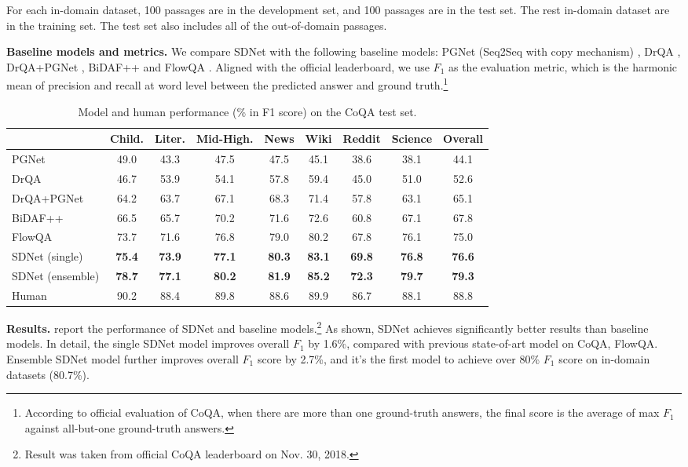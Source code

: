 \documentclass{article} \usepackage{sdnet,times}
\begin{document}
For each in-domain dataset, 100 passages are in the development set, and 100 passages are in the test set. The rest in-domain dataset are in the training set. The test set also includes all of the out-of-domain passages.

\textbf{Baseline models and metrics.}
We compare SDNet with the following baseline models: PGNet (Seq2Seq with copy mechanism) \citep{pgnet}, DrQA \citep{drqa}, DrQA+PGNet \citep{coqa}, BiDAF++ \citep{bidafplusplus} and FlowQA \citep{flowqa}. Aligned with the official leaderboard, we use $F_1$ as the evaluation metric, which is the harmonic mean of precision and recall at word level between the predicted answer and ground truth.\footnote{According to official evaluation of CoQA, when there are more than one ground-truth answers, the final score is the average of max $F_1$ against all-but-one ground-truth answers.}

\begin{table*}[t]
\centering
\caption{Model and human performance (\% in F1 score) on the CoQA test set.} 
\label{table:mainresult}
\vspace{-0.5\baselineskip}
\setlength{\tabcolsep}{2pt}
\begin{tabular}{l|ccccccc|c}
\toprule
 & Child. & Liter. & Mid-High. & News & Wiki & Reddit & Science & Overall \\
 \midrule
 \midrule
PGNet & 49.0 & 43.3 & 47.5 & 47.5 & 45.1 & 38.6 & 38.1 & 44.1 \\
DrQA & 46.7 & 53.9 & 54.1 & 57.8 & 59.4 & 45.0 & 51.0 & 52.6 \\
DrQA+PGNet & 64.2 & 63.7 & 67.1 & 68.3 & 71.4 & 57.8 & 63.1 & 65.1 \\
BiDAF++ & 66.5 & 65.7 & 70.2 & 71.6 & 72.6 & 60.8 & 67.1 & 67.8 \\
FlowQA & 73.7 & 71.6 & 76.8 & 79.0 & 80.2 & 67.8 & 76.1 & 75.0 \\
SDNet (single) & \textbf{75.4} & \textbf{73.9} & \textbf{77.1} & \textbf{80.3} & \textbf{83.1} & \textbf{69.8} & \textbf{76.8} & \textbf{76.6} \\
SDNet (ensemble) & \textbf{78.7} & \textbf{77.1} & \textbf{80.2} & \textbf{81.9} & \textbf{85.2} & \textbf{72.3} & \textbf{79.7} & \textbf{79.3} \\
\midrule
Human & 90.2 & 88.4 & 89.8 & 88.6 & 89.9 & 86.7 & 88.1 & 88.8 
\end{tabular}
\end{table*}

\textbf{Results.}   report the performance of SDNet and baseline models.\footnote{Result was taken from official CoQA leaderboard on Nov. 30, 2018.} As shown, SDNet achieves significantly better results than baseline models. In detail, the single SDNet model improves overall $F_1$ by 1.6\%, compared with previous state-of-art model on CoQA, FlowQA. Ensemble SDNet model further improves overall $F_1$ score by 2.7\%, and it's the first model to achieve over 80\% $F_1$ score on in-domain datasets (80.7\%).
\end{document}
